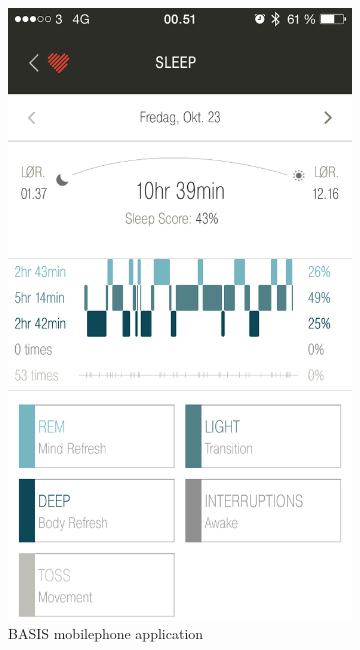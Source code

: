 \documentclass[12pt]{article} %
\begin{document}
\begin{figure}[H]
    \centering
    \begin{subfigure}[b]{0.45\textwidth}
        \includegraphics[width=\textwidth]{24-10-basis}
        \caption{BASIS mobilephone application}
        \label{fig:basis0}
    \end{subfigure}
    ~ %
    \begin{subfigure}[b]{0.45\textwidth}

\end{subfigure}
\end{figure}
\end{document}
